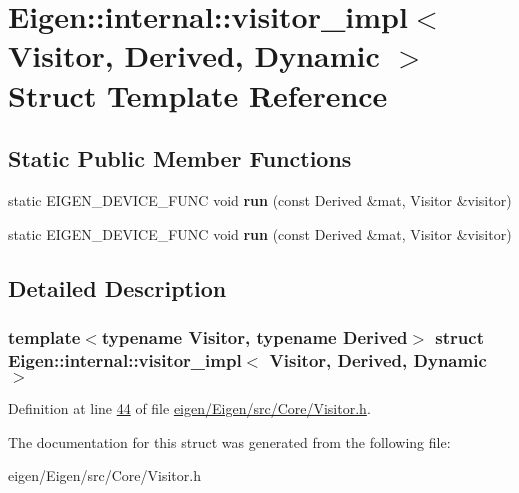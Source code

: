 \hypertarget{struct_eigen_1_1internal_1_1visitor__impl_3_01_visitor_00_01_derived_00_01_dynamic_01_4}{}\section{Eigen\+:\+:internal\+:\+:visitor\+\_\+impl$<$ Visitor, Derived, Dynamic $>$ Struct Template Reference}
\label{struct_eigen_1_1internal_1_1visitor__impl_3_01_visitor_00_01_derived_00_01_dynamic_01_4}
\subsection*{Static Public Member Functions}
\begin{DoxyCompactItemize}
\item 
\mbox{\label{struct_eigen_1_1internal_1_1visitor__impl_3_01_visitor_00_01_derived_00_01_dynamic_01_4_ad461f2734f94c0fd05dc0180b2724cc6}} 
static E\+I\+G\+E\+N\+\_\+\+D\+E\+V\+I\+C\+E\+\_\+\+F\+U\+NC void {\bfseries run} (const Derived \&mat, Visitor \&visitor)
\item 
\mbox{\label{struct_eigen_1_1internal_1_1visitor__impl_3_01_visitor_00_01_derived_00_01_dynamic_01_4_ad461f2734f94c0fd05dc0180b2724cc6}} 
static E\+I\+G\+E\+N\+\_\+\+D\+E\+V\+I\+C\+E\+\_\+\+F\+U\+NC void {\bfseries run} (const Derived \&mat, Visitor \&visitor)
\end{DoxyCompactItemize}


\subsection{Detailed Description}
\subsubsection*{template$<$typename Visitor, typename Derived$>$\newline
struct Eigen\+::internal\+::visitor\+\_\+impl$<$ Visitor, Derived, Dynamic $>$}



Definition at line \hyperlink{eigen_2_eigen_2src_2_core_2_visitor_8h_source_l00044}{44} of file \hyperlink{eigen_2_eigen_2src_2_core_2_visitor_8h_source}{eigen/\+Eigen/src/\+Core/\+Visitor.\+h}.



The documentation for this struct was generated from the following file\+:\begin{DoxyCompactItemize}
\item 
eigen/\+Eigen/src/\+Core/\+Visitor.\+h\end{DoxyCompactItemize}

